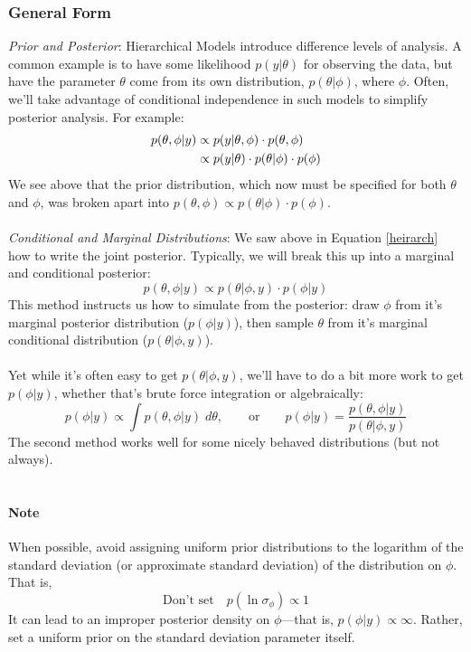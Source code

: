 \documentclass[12pt]{article}
\theoremstyle{plain}
\theoremstyle{definition}
\theoremstyle{remark}
\begin{document}
\subsubsection{General Form}
{\sl Prior and Posterior}:
Hierarchical Models introduce difference
levels of analysis.  A common example is to have some likelihood
$p(y|\theta)$ for observing the data, but have the parameter $\theta$
come from its own distribution, $p(\theta |\phi)$, where $\phi$.
Often, we'll take advantage of
conditional independence in such models to simplify
posterior analysis. For example:
\begin{align}
   \label{heirarch}
   p(\theta,\phi|y) &\propto p(y| \theta, \phi)\cdot p(\theta, \phi)
      \notag\\
   &\propto p(y|\theta) \cdot p(\theta|\phi)\cdot p(\phi)
\end{align}
We see above that the prior distribution, which now must be specified
for both $\theta$ and $\phi$, was broken apart into
$p(\theta, \phi) \propto p(\theta|\phi) \cdot p(\phi)$.
\\
\\
{\sl Conditional and Marginal Distributions}: We saw above
in Equation \ref{heirarch} how to write the joint posterior.
Typically, we will break this up into a marginal and conditional
posterior:
\[ p(\theta, \phi|y) \propto p(\theta | \phi, y)\cdot p(\phi | y) \]
This method instructs us how to simulate from the posterior:
draw $\phi$ from it's marginal posterior distribution ($p(\phi|y)$),
then sample $\theta$ from it's marginal conditional distribution
($p(\theta | \phi, y)$).
\\
\\
Yet while it's often easy to get $p(\theta | \phi, y)$, we'll have to
do a bit more work to get $p(\phi |y)$, whether that's brute force
integration or algebraically:
\[ p(\phi|y) \propto \int p(\theta, \phi | y) \; d\theta, \qquad
   \text{or} \qquad p(\phi | y) = \frac{p(\theta, \phi | y)}{
   p(\theta | \phi, y)}\]
The second method works well for some nicely behaved distributions (but
not always).
\\
\\
\paragraph{Note} When possible, avoid assigning uniform prior
distributions
to the logarithm of the standard deviation (or approximate standard
deviation) of the distribution on
$\phi$. That is,
\[ \text{Don't set} \quad p(\ln \sigma_\phi) \propto 1 \]
It can lead to an improper posterior density on $\phi$---that is,
$p(\phi | y) \propto \infty$. Rather, set a uniform prior on the
standard deviation parameter itself.
\end{document}
